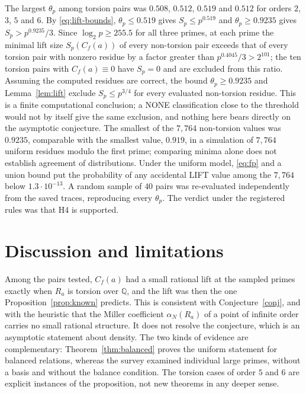 \documentclass[11pt,a4paper]{article}
\numberwithin{equation}{section}
\theoremstyle{plain}
\theoremstyle{definition}
\newcommand{\Q}{\mathbb{Q}}
\begin{document}
The largest $\theta_p$ among torsion pairs was $0.508$, $0.512$, $0.519$ and $0.512$ for orders $2$, $3$, $5$ and $6$. By \eqref{eq:lift-bounds}, $\theta_p\le0.519$ gives $S_p\le p^{0.519}$ and $\theta_p\ge0.9235$ gives $S_p>p^{0.9235}/3$. Since $\log_2p\ge255.5$ for all three primes, at each prime the minimal lift size $S_p(C_f(a))$ of every non-torsion pair exceeds that of every torsion pair with nonzero residue by a factor greater than $p^{0.4045}/3>2^{101}$; the ten torsion pairs with $C_f(a)\equiv0$ have $S_p=0$ and are excluded from this ratio. Assuming the computed residues are correct, the bound $\theta_p\ge0.9235$ and Lemma~\ref{lem:lift} exclude $S_p\le p^{3/4}$ for every evaluated non-torsion residue. This is a finite computational conclusion; a NONE classification close to the threshold would not by itself give the same exclusion, and nothing here bears directly on the asymptotic conjecture. The smallest of the $7{,}764$ non-torsion values was $0.9235$, comparable with the smallest value, $0.919$, in a simulation of $7{,}764$ uniform residues modulo the first prime; comparing minima alone does not establish agreement of distributions. Under the uniform model, \eqref{eq:fp} and a union bound put the probability of any accidental LIFT value among the $7{,}764$ below $1.3\cdot10^{-13}$. A random sample of $40$ pairs was re-evaluated independently from the saved traces, reproducing every $\theta_p$. The verdict under the registered rules was that H4 is supported.

\section{Discussion and limitations}\label{sec:discussion}

Among the pairs tested, $C_f(a)$ had a small rational lift at the sampled primes exactly when $R_a$ is torsion over $\Q$, and the lift was then the one Proposition~\ref{prop:known} predicts. This is consistent with Conjecture~\ref{conj}, and with the heuristic that the Miller coefficient $\alpha_N(R_a)$ of a point of infinite order carries no small rational structure. It does not resolve the conjecture, which is an asymptotic statement about density. The two kinds of evidence are complementary: Theorem~\ref{thm:balanced} proves the uniform statement for balanced relations, whereas the survey examined individual large primes, without a basis and without the balance condition. The torsion cases of order $5$ and $6$ are explicit instances of the proposition, not new theorems in any deeper sense.
\end{document}
